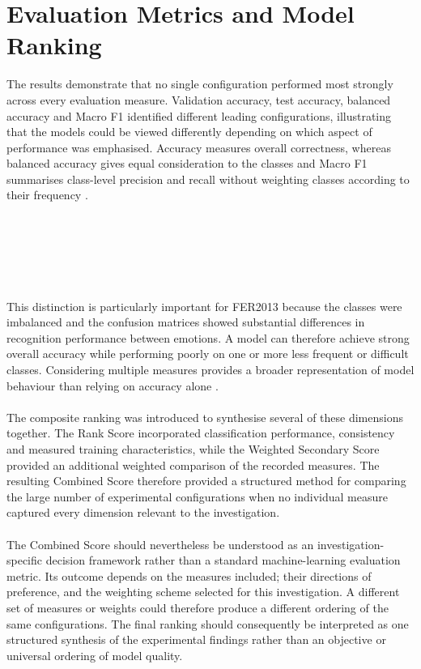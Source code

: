 \documentclass[12pt, a4paper]{report}
\let\oldsection\section
\renewcommand{\section}{%
    \Needspace{6\baselineskip}%
    \oldsection
}
\begin{document}
		\section{Evaluation Metrics and Model Ranking}
			
			The results demonstrate that no single configuration performed most strongly across every evaluation measure. Validation accuracy, test accuracy, balanced accuracy and Macro F1 identified different leading configurations, illustrating that the models could be viewed differently depending on which aspect of performance was emphasised. Accuracy measures overall correctness, whereas balanced accuracy gives equal consideration to the classes and Macro F1 summarises class-level precision and recall without weighting classes according to their frequency \cite{Opitz2024ClassificationMetrics, Farhadpour2024MetricsImbalance}.\\\\\\\\\\\\\\
			This distinction is particularly important for FER2013 because the classes were imbalanced and the confusion matrices showed substantial differences in recognition performance between emotions. A model can therefore achieve strong overall accuracy while performing poorly on one or more less frequent or difficult classes. Considering multiple measures provides a broader representation of model behaviour than relying on accuracy alone \cite{Johnson2019ClassImbalance, Farhadpour2024MetricsImbalance}.\\\\
			The composite ranking was introduced to synthesise several of these dimensions together. The Rank Score incorporated classification performance, consistency and measured training characteristics, while the Weighted Secondary Score provided an additional weighted comparison of the recorded measures. The resulting Combined Score therefore provided a structured method for comparing the large number of experimental configurations when no individual measure captured every dimension relevant to the investigation.\\\\
			The Combined Score should nevertheless be understood as an investigation-specific decision framework rather than a standard machine-learning evaluation metric. Its outcome depends on the measures included; their directions of preference, and the weighting scheme selected for this investigation. A different set of measures or weights could therefore produce a different ordering of the same configurations. The final ranking should consequently be interpreted as one structured synthesis of the experimental findings rather than an objective or universal ordering of model quality.\\\\
\end{document}
